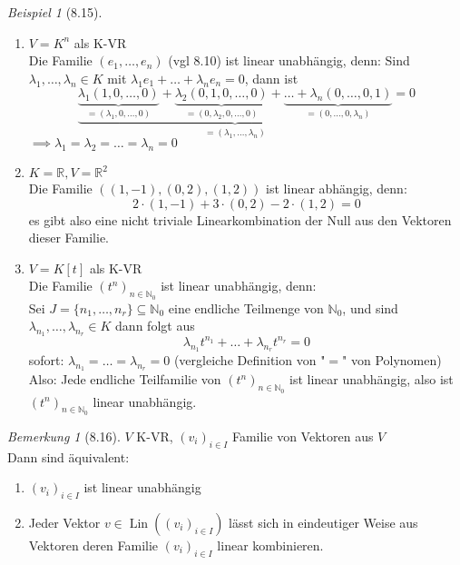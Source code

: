 \documentclass[a4paper]{scrartcl}
\DeclareMathOperator{\Lin}{Lin}
\theoremstyle{definition}
\theoremstyle{plain}
\theoremstyle{plain}
\theoremstyle{remark}
\newtheorem{remark}{Bemerkung}
\theoremstyle{remark}
\theoremstyle{remark}
\theoremstyle{remark}
\theoremstyle{remark}
\newtheorem{ex}{Beispiel}
\begin{document}
\begin{ex}[8.15]
\mbox{}
\begin{enumerate}
\item $V = K^n$ als K-VR \\
     Die Familie $(e_1, \ldots, e_n)$ (vgl 8.10) ist linear unabhängig, denn:
Sind $\lambda_1, \ldots, \lambda_n \in K$ mit $\lambda_1 e_1 + \ldots + \lambda_n e_n = 0$, dann ist
\[\underbrace{\underbrace{\lambda_1 (1, 0, \ldots, 0)}_{=(\lambda_1, 0, \ldots, 0)} + \underbrace{\lambda_2 (0, 1, 0, \ldots, 0)}_{= (0, \lambda_2, 0, \ldots, 0)} + \underbrace{\ldots + \lambda_n (0, \ldots, 0, 1)}_{=(0,\ldots,0,\lambda_n)}}_{= (\lambda_1, \ldots, \lambda_n)} = 0\]
$\implies \lambda_1 = \lambda_2 = \ldots = \lambda_n = 0$
\item $K = \mathbb{R}, V = \mathbb{R}^2$ \\
     Die Familie $((1, -1), (0,2), (1,2))$ ist linear abhängig, denn:
\[2\cdot(1,-1) + 3\cdot(0,2) - 2\cdot(1,2) = 0\]
es gibt also eine nicht triviale Linearkombination der Null aus den Vektoren dieser Familie.
\item $V = K[t]$ als K-VR \\
     Die Familie $(t^n)_{n\in \mathbb{N}_0}$ ist linear unabhängig, denn: \\
     Sei $J = \{n_1, \ldots, n_r\} \subseteq \mathbb{N}_0$ eine endliche Teilmenge von $\mathbb{N}_0$, und sind $\lambda_{n_1}, \ldots, \lambda_{n_r} \in K$
dann folgt aus
\[\lambda_{n_1}t^{n_1} + \ldots + \lambda_{n_r} t^{n_r} = 0\]
sofort: $\lambda_{n_1} = \ldots = \lambda_{n_r} = 0$ (vergleiche Definition von "$=$" von Polynomen)
Also: Jede endliche Teilfamilie von $(t^n)_{n\in\mathbb{N}_0}$ ist linear unabhängig, also ist $(t^n)_{n\in\mathbb{N}_0}$ linear unabhängig.
\end{enumerate}
\end{ex}
\begin{remark}[8.16]
$V$ K-VR, $(v_i)_{i\in I}$ Familie von Vektoren aus $V$ \\
  Dann sind äquivalent:
\begin{enumerate}
\item $(v_i)_{i \in I}$ ist linear unabhängig
\item Jeder Vektor $v \in \Lin((v_i)_{i\in I})$ lässt sich in eindeutiger Weise aus Vektoren deren Familie $(v_i)_{i\in I}$ linear kombinieren.
\end{enumerate}
\end{remark}
\end{document}
